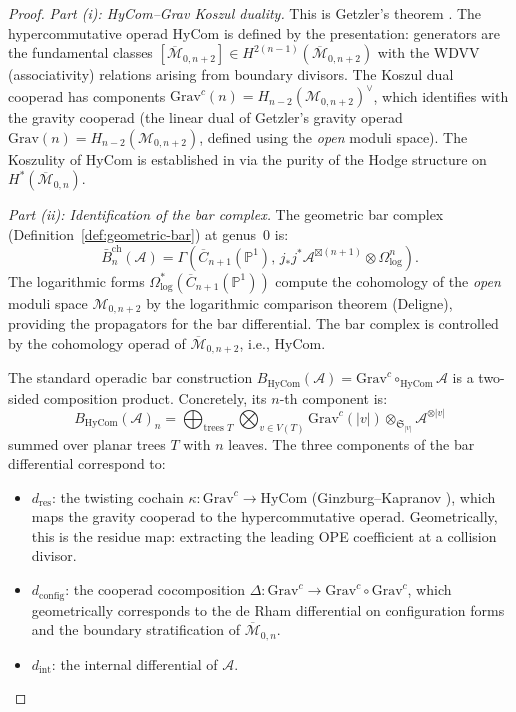 \begin{proof}
\emph{Part (i): HyCom--Grav Koszul duality.}
This is Getzler's theorem \cite[Theorem~2.3]{Get95}.  The
hypercommutative operad $\mathrm{HyCom}$ is defined by the
presentation: generators are the fundamental classes
$[\overline{\mathcal{M}}_{0,n+2}] \in H^{2(n-1)}(
\overline{\mathcal{M}}_{0,n+2})$ with the WDVV (associativity)
relations arising from boundary divisors.  The Koszul dual cooperad
has components $\mathrm{Grav}^c(n) = H_{n-2}(
\mathcal{M}_{0,n+2})^{\vee}$, which identifies with the gravity
cooperad (the linear dual of Getzler's gravity operad
$\mathrm{Grav}(n) = H_{n-2}(\mathcal{M}_{0,n+2})$, defined using
the \emph{open} moduli space).  The Koszulity of $\mathrm{HyCom}$ is
established in \cite[Theorem~2.3]{Get95} via the purity of the Hodge
structure on $H^*(\overline{\mathcal{M}}_{0,n})$.

\emph{Part (ii): Identification of the bar complex.}
The geometric bar complex (Definition~\ref{def:geometric-bar}) at
genus~$0$ is:
\[
\bar{B}^{\mathrm{ch}}_n(\mathcal{A}) = \Gamma\!\left(
  \overline{C}_{n+1}(\mathbb{P}^1),\,
  j_*j^*\mathcal{A}^{\boxtimes(n+1)}
  \otimes \Omega^n_{\log}
\right).
\]
The logarithmic forms $\Omega^*_{\log}(\overline{C}_{n+1}(\mathbb{P}^1))$
compute the cohomology of the \emph{open} moduli space
$\mathcal{M}_{0,n+2}$ by the logarithmic comparison theorem (Deligne),
providing the propagators for the bar differential.  The bar complex
is controlled by the cohomology operad of
$\overline{\mathcal{M}}_{0,n+2}$, i.e., $\mathrm{HyCom}$.

The standard operadic bar construction
$B_{\mathrm{HyCom}}(\mathcal{A}) = \mathrm{Grav}^c \circ_{\mathrm{HyCom}}
\mathcal{A}$ is a two-sided composition product.  Concretely, its $n$-th
component is:
\[
B_{\mathrm{HyCom}}(\mathcal{A})_n
= \bigoplus_{\text{trees } T} \bigotimes_{v \in V(T)}
  \mathrm{Grav}^c(|v|) \otimes_{\mathfrak{S}_{|v|}} \mathcal{A}^{\otimes |v|}
\]
summed over planar trees $T$ with $n$ leaves.  The three components of
the bar differential correspond to:
\begin{itemize}
\item $d_{\mathrm{res}}$: the twisting cochain
  $\kappa\colon \mathrm{Grav}^c \to \mathrm{HyCom}$
  (Ginzburg--Kapranov \cite[§2.1]{GK94}), which maps
  the gravity cooperad to the hypercommutative operad.  Geometrically,
  this is the residue map: extracting the leading OPE coefficient at
  a collision divisor.
\item $d_{\mathrm{config}}$: the cooperad cocomposition
  $\Delta\colon \mathrm{Grav}^c \to \mathrm{Grav}^c \circ
  \mathrm{Grav}^c$, which geometrically corresponds to the de Rham
  differential on configuration forms and the
  boundary stratification of $\overline{\mathcal{M}}_{0,n}$.
\item $d_{\mathrm{int}}$: the internal differential of $\mathcal{A}$.
\end{itemize}


\end{proof}
